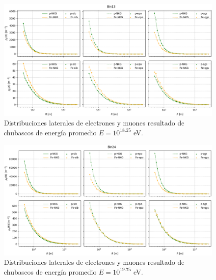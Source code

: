 \documentclass[11pt,table,compress]{beamer}
\begin{document}
	\begin{frame}
		\begin{figure}[] 
		\centering
		\includegraphics[height=0.7\textheight, width=\textwidth]{Figuras/distlat_bin13}
		\caption{Distribuciones laterales de electrones y muones resultado de chubascos de energía promedio $E=10^{18.25}$ eV.}
		\label{fig:distlat_bin13}
		\end{figure}
	\end{frame}		
		
	\begin{frame}	
		\begin{figure}[] 
		\centering
		\includegraphics[height=0.7\textheight, width=\textwidth]{Figuras/distlat_bin24}
		\caption{Distribuciones laterales de electrones y muones resultado de chubascos de energía promedio $E=10^{19.75}$ eV.}
		\label{fig:distlat_bin24}
		\end{figure}
	\end{frame}
	
\end{document}
